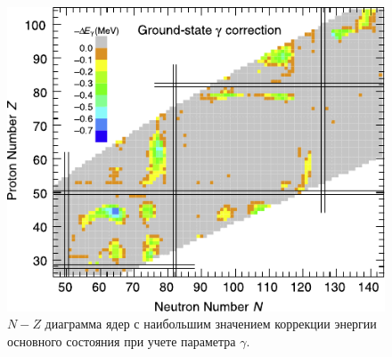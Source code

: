 \documentclass[a4paper, 10pt, twocolumn]{article}
\begin{document}
\begin{figure}%
	\centering
	\includegraphics[width=\linewidth]{figures/delta-e-gamma}
	\caption{$N-Z$ диаграмма ядер с наибольшим значением коррекции энергии основного состояния при учете параметра $\gamma$.}
	\label{fig:delta-e-gamma}
\end{figure}%
\end{document}
